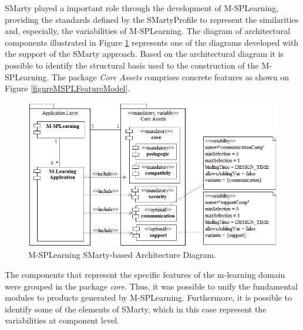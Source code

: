 SMarty played a important role through the development of M-SPLearning, providing the standards defined by the SMartyProfile to represent the similarities and, especially, the variabilities of M-SPLearning. The diagram of architectural components illustrated in Figure \ref{figureMSPLArchitecture} represents one of the diagrams developed with the support of the SMarty approach. Based on the architectural diagram it is possible to identify the structural basis used to the construction of the M-SPLearning. The package \textit{Core Assets} comprises concrete features as shown on Figure \ref{figureMSPLFeatureModel}.

\begin{figure}
    \centering
    \includegraphics[scale=0.55]{figures/section3/MSPLArchitecture}
    \caption{M-SPLearning SMarty-based Architecture Diagram.}
    \label{figureMSPLArchitecture}
\end{figure}

The components that represent the specific features of the m-learning domain were grouped in the package \textit{core}. Thus, it was possible to unify the fundamental modules to products generated by M-SPLearning. Furthermore, it is possible to identify some of the elements of SMarty, which in this case represent the variabilities at component level.

